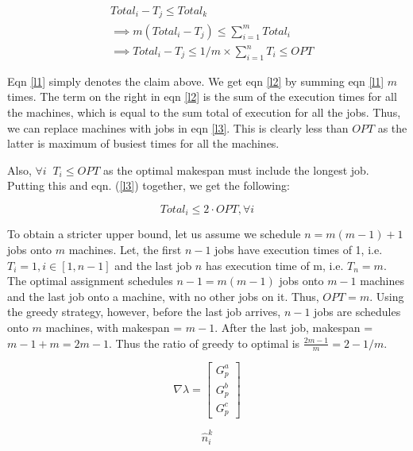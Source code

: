 \documentclass[assign]{article}
\begin{document}
\begin{eqnarray}
&  Total_i - T_j  \le Total_k \label{l1} \\
 & \implies  m(Total_i- T_j) \le \sum_{i=1}^{m} Total_i \; \; \;  \label{l2}  \\
 & \implies Total_i - T_j \le 1/m \times \sum_{i=1}^{n} T_i \le OPT \label{l3} 
\end{eqnarray}

Eqn \ref{l1} simply denotes the claim above. We get eqn \ref{l2} by summing eqn \ref{l1} $m$ times. The term on the right in eqn \ref{l2} is the sum of the execution times for all the machines, which is equal to the sum total of execution for all the jobs. Thus, we can replace machines with jobs in eqn \ref{l3}. This is clearly less than $OPT$ as the latter is maximum of busiest times for all the machines. 

\par Also, $\forall i \; \; T_i \le OPT$ as the optimal makespan must include the longest job. Putting this and eqn. (\ref{l3}) together, we get the following:

\begin{equation*}
   Total_i \le 2 \cdot OPT, \forall i
\end{equation*}

To obtain a stricter upper bound, let us assume we schedule $n = m(m-1)+1$ jobs onto $m$ machines. Let, the first $n-1$ jobs have execution times of 1, i.e. $T_i = 1, i \in \left [1,n-1\right ]$ and the last job $n$ has execution time of m, i.e. $T_n = m$.  The optimal assignment schedules $n-1 = m(m-1)$ jobs onto $m-1$ machines and the last job onto a machine, with no other jobs on it. Thus, $OPT = m$. Using the greedy strategy, however, before the last job arrives, $n-1$ jobs are schedules onto $m$ machines, with makespan = $m-1$. After the last job,  makespan = $m-1+m = 2m-1$. Thus the ratio of greedy to optimal is $\frac{2m-1}{m} = 2 - 1/m$. 

\begin{equation}
  \nabla \lambda = \begin{bmatrix}
 G^{a}_{p} \\
 G^{b}_{p} \\
 G^{c}_{p} 
\end{bmatrix}
\end{equation}

\begin{equation}
  \hat{n}^{k}_{i}
\end{equation}
\end{document}
